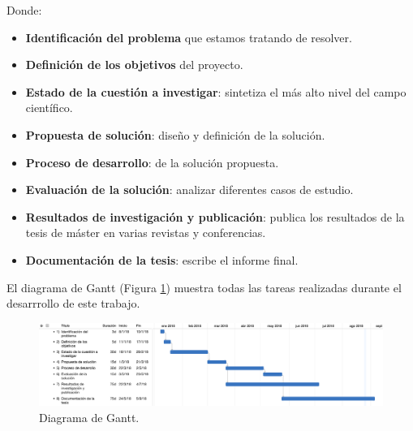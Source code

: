 Donde:

\begin{itemize}

\item \textbf{Identificación del problema} que estamos tratando de resolver.

\item \textbf{Definición de los objetivos} del proyecto.

\item \textbf{Estado de la cuestión a investigar}: sintetiza el más alto nivel del campo científico.

\item \textbf{Propuesta de solución}: diseño y definición de la solución.

\item \textbf{Proceso de desarrollo}: de la solución propuesta.

\item \textbf{Evaluación de la solución}: analizar diferentes casos de estudio.

\item \textbf{Resultados de investigación y publicación}: publica los resultados de la tesis de máster en varias revistas y conferencias.

\item \textbf{Documentación de la tesis}: escribe el informe final.

\end{itemize}

El diagrama de Gantt (Figura \ref{fig:gantt}) muestra todas las tareas realizadas durante el desarrrollo de este trabajo.

\vspace{0.5cm}
\begin{figure}[htbp]
 	\centering
 	\includegraphics[width=16.5cm]{figures/DiagramaJavi.pdf}
 	\caption{Diagrama de Gantt.}
	\label{fig:gantt}
\end{figure}
\vspace{0.35cm}


